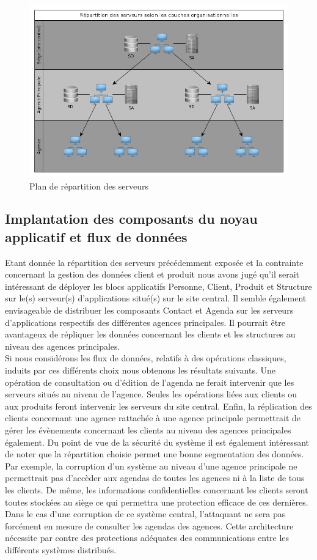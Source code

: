\begin{figure}[H]
    \centering
    \includegraphics[scale=0.5]{figures/architectureServeurs.png}
    \caption{Plan de répartition des serveurs}
\end{figure}

\subsection{Implantation des composants du noyau applicatif et flux de données}

Etant donnée la répartition des serveurs précédemment exposée et la contrainte concernant la gestion des données client et produit nous avons jugé qu'il serait intéressant de déployer les blocs applicatifs Personne, Client, Produit et Structure sur le(s) serveur(s) d'applications situé(s) sur le site central. Il semble également envisageable de distribuer les composants Contact et Agenda sur les serveurs d'applications respectifs des différentes agences principales. Il pourrait être avantageux de répliquer les données concernant les clients et les structures au niveau des agences principales. \\

Si nous considérons les flux de données, relatifs à des opérations classiques, induits par ces différents choix nous obtenons les résultats suivants. Une opération de consultation ou d'édition de l'agenda ne ferait intervenir que les serveurs situés au niveau de l'agence. Seules les opérations liées aux clients ou aux produits feront intervenir les serveurs du site central. Enfin, la réplication des clients concernant une agence rattachée à une agence principale permettrait de gérer les évènements concernant les clients au niveau des agences principales également.
Du point de vue de la sécurité du système il est également intéressant de noter que la répartition choisie permet une bonne segmentation des données. Par exemple, la corruption d'un système au niveau d'une agence principale ne permettrait pas d'accèder aux agendas de toutes les agences ni à la liste de tous les clients. De même, les informations confidentielles concernant les clients seront toutes stockées au siège ce qui permettra une protection efficace de ces dernières. Dans le cas d'une corruption de ce système central, l'attaquant ne sera pas forcément en mesure de consulter les agendas des agences. Cette architecture nécessite par contre des protections adéquates des communications entre les différents systèmes distribués.
